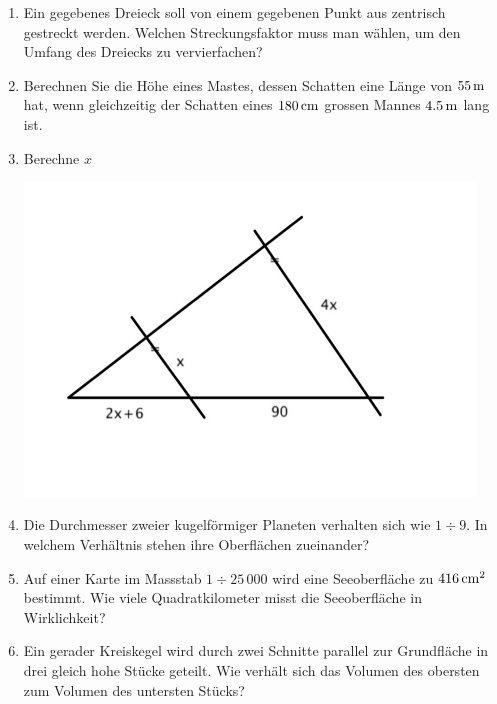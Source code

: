 \documentclass[%
11pt,%
twoside,%
titlepage,%
a4page,%
headsepline%
]{scrartcl}
\begin{document}
\begin{enumerate}
\item Ein gegebenes Dreieck soll von einem gegebenen Punkt aus zentrisch gestreckt werden. Welchen Streckungsfaktor muss man w\"ahlen, um den Umfang des Dreiecks zu vervierfachen?
\item Berechnen Sie die H\"ohe eines Mastes, dessen Schatten eine L\"ange von $\unit[55]{m}$ hat, wenn gleichzeitig der Schatten eines $\unit[180]{cm}$ grossen Mannes $\unit[4.5]{m}$ lang ist.
\item Berechne $x$
\begin{center}
\includegraphics[width=12cm]{pictures/seueb6}
\end{center}
\item Die Durchmesser zweier kugelf\"ormiger Planeten verhalten sich wie $1\div9$. In welchem Verh\"altnis stehen ihre Oberfl\"achen zueinander?
\item Auf einer Karte im Massstab $1\div25\,000$ wird eine Seeoberfl\"ache zu $\unit[416]{cm^2}$ bestimmt. Wie viele Quadratkilometer misst die Seeoberfl\"ache in Wirklichkeit?
\item Ein gerader Kreiskegel wird durch zwei Schnitte parallel zur Grundfl\"ache in drei gleich hohe St\"ucke geteilt. Wie verh\"alt sich das Volumen des obersten zum Volumen des untersten St\"ucks?

\end{enumerate}

\pagebreak


%



%
%
\end{document}

